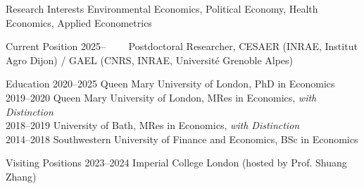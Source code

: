 \documentclass{resume} %
\begin{document}
	
	\begin{rSection}{Research Interests}
	Environmental Economics, Political Economy, Health Economics, Applied Econometrics
	\end{rSection}
	
\vspace{2pt}
	
	\begin{rSection}{Current Position}
2025--\textcolor{white}{2025} Postdoctoral Researcher, CESAER (INRAE, Institut Agro Dijon) / GAEL (CNRS, INRAE, Universit\'e Grenoble Alpes)   \hfill
	\end{rSection}
	
\vspace{2pt}
	
\begin{rSection}{Education}
	2020–2025 \quad Queen Mary University of London, PhD in Economics \\[3pt]
	2019–2020 \quad Queen Mary University of London, MRes in Economics, \textit{with Distinction} \\[3pt]
	2018–2019 \quad University of Bath, MRes in Economics, \textit{with Distinction} \\[3pt]	
	2014–2018 \quad Southwestern University of Finance and Economics, BSc in Economics
\end{rSection}

	\vspace{2pt}

	
	\begin{rSection}{Visiting Positions}
	2023–2024 \quad Imperial College London (hosted by Prof. Shuang Zhang) 
	\end{rSection}
	
\vspace{2pt}
	
\end{document}
